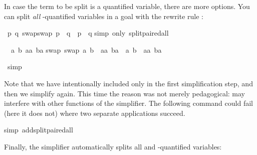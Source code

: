 \begin{isabellebody}
\begin{isamarkuptxt}
In case the term to be split is a quantified variable, there are more options.
You can split \emph{all} \isa{{\isasymAnd}}-quantified variables in a goal
with the rewrite rule :%
\end{isamarkuptxt}%
\isamarkuptrue%
\isamarkupfalse%
\ {\isachardoublequote}{\isasymAnd}p\ q{\isachardot}\ swap{\isacharparenleft}swap\ p{\isacharparenright}\ {\isacharequal}\ q\ {\isasymlongrightarrow}\ p\ {\isacharequal}\ q{\isachardoublequote}\isanewline
\isamarkupfalse%
simp\ only{\isacharcolon}\ split{\isacharunderscore}paired{\isacharunderscore}all{\isacharparenright}\isamarkupfalse%
%
\begin{isamarkuptxt}%
\noindent
\begin{isabelle}%
\ {}{\isachardot}\ {\isasymAnd}a\ b\ aa\ ba{\isachardot}\isanewline
{}swap\ {\isacharparenleft}swap\ {\isacharparenleft}a{\isacharcomma}\ b{\isacharparenright}{\isacharparenright}\ {\isacharequal}\ {\isacharparenleft}aa{\isacharcomma}\ ba{\isacharparenright}\ {\isasymlongrightarrow}\ {\isacharparenleft}a{\isacharcomma}\ b{\isacharparenright}\ {\isacharequal}\ {\isacharparenleft}aa{\isacharcomma}\ ba{\isacharparenright}%
\end{isabelle}%
\end{isamarkuptxt}%
\isamarkuptrue%
\ simp\isanewline
\isamarkupfalse%
\isamarkupfalse%
%
\begin{isamarkuptext}%
\noindent
Note that we have intentionally included only 
in the first simplification step, and then we simplify again. 
This time the reason was not merely
pedagogical:
 may interfere with other functions
of the simplifier.
The following command could fail (here it does not)
where two separate  applications succeed.%
\end{isamarkuptext}%
\isamarkuptrue%
\isamarkupfalse%
simp\ add{\isacharcolon}split{\isacharunderscore}paired{\isacharunderscore}all{\isacharparenright}\isamarkupfalse%
\isamarkupfalse%
%
\begin{isamarkuptext}%
\noindent
Finally, the simplifier automatically splits all \isa{{\isasymforall}} and
\isa{{\isasymexists}}-quantified variables:%
\end{isamarkuptext}%
\isamarkuptrue%

\end{isabellebody}
